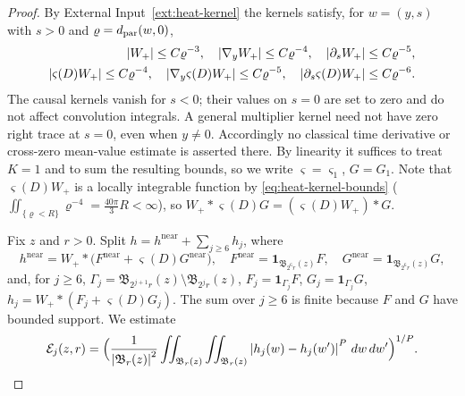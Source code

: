 \documentclass[11pt,reqno]{amsart}
\begin{document}
\begin{proof}
By External Input~\ref{ext:heat-kernel} the kernels satisfy, for
$w=(y,s)$ with $s>0$ and $\varrho=d_{\mathrm{par}}(w,0)$,
\begin{equation}\label{eq:heat-kernel-bounds}
 \begin{aligned}
  \left\lvert W_{+} \right\rvert\le C\varrho^{-3},\quad
  \left\lvert \nabla_{y}W_{+} \right\rvert\le C\varrho^{-4},\quad
  \left\lvert \partial_{s}W_{+} \right\rvert\le C\varrho^{-5},\\
  \left\lvert \varsigma(D)W_{+} \right\rvert\le C\varrho^{-4},\quad
  \left\lvert \nabla_{y}\varsigma(D)W_{+} \right\rvert\le C\varrho^{-5},\quad
  \left\lvert \partial_{s}\varsigma(D)W_{+} \right\rvert\le C\varrho^{-6}.
 \end{aligned}
\end{equation}
The causal kernels vanish for $s<0$; their values on $s=0$ are set to zero
and do not affect convolution integrals. A general multiplier kernel need
not have zero right trace at $s=0$, even when $y\ne0$. Accordingly no
classical time derivative or cross-zero mean-value estimate is asserted
there.
By linearity it suffices to treat $K=1$ and to sum the resulting bounds, so we
write $\varsigma=\varsigma_{1}$, $G=G_{1}$. Note that $\varsigma(D)W_{+}$ is a
locally integrable function by \eqref{eq:heat-kernel-bounds}
($\iint_{\{\varrho<R\}}\varrho^{-4}=\tfrac{40\pi}{3}R<\infty$), so
$W_{+}*\varsigma(D)G=(\varsigma(D)W_{+})*G$.

Fix $z$ and $r>0$. Split $h=h^{\mathrm{near}}+\sum_{j\ge6}h_{j}$, where
\[
  h^{\mathrm{near}}=W_{+}*\bigl(F^{\mathrm{near}}+\varsigma(D)G^{\mathrm{near}}\bigr),
  \quad
  F^{\mathrm{near}}=\mathbf{1}_{\mathfrak{B}_{2^{6}r}(z)}F,
  \quad
  G^{\mathrm{near}}=\mathbf{1}_{\mathfrak{B}_{2^{6}r}(z)}G,
\]
and, for $j\ge6$,
$\Gamma_{j}=\mathfrak{B}_{2^{j+1}r}(z)\setminus\mathfrak{B}_{2^{j}r}(z)$,
$F_{j}=\mathbf{1}_{\Gamma_{j}}F$, $G_{j}=\mathbf{1}_{\Gamma_{j}}G$,
$h_{j}=W_{+}*(F_{j}+\varsigma(D)G_{j})$. The sum over $j\ge6$ is finite because
$F$ and $G$ have bounded support. We estimate
\begin{equation}\label{eq:campanato-quantity}
  \mathcal{E}_{j}(z,r)
  =\Bigl(\frac{1}{\left\lvert \mathfrak{B}_{r}(z) \right\rvert^{2}}
    \iint_{\mathfrak{B}_{r}(z)}\iint_{\mathfrak{B}_{r}(z)}
      \left\lvert h_{j}(w)-h_{j}(w') \right\rvert^{P}\,dw\,dw'\Bigr)^{1/P}.
\end{equation}


\end{proof}
\end{document}
